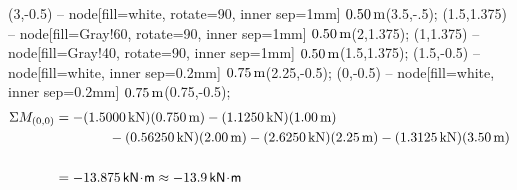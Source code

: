 \documentclass[10pt,oneside]{article}
\begin{document}
\begin{textblock*}{6.5in}
{     (3,-0.5) -- node[fill=white, rotate=90, inner sep=1mm] {\small $0.50\thinspace\text{m}$}(3.5,-.5);
     (1.5,1.375) -- node[fill=Gray!60, rotate=90, inner sep=1mm] {\small $0.50\thinspace\text{m}$}(2,1.375);
     (1,1.375) -- node[fill=Gray!40, rotate=90, inner sep=1mm] {\small $0.50\thinspace\text{m}$}(1.5,1.375);
     (1.5,-0.5) -- node[fill=white, inner sep=0.2mm] {\small $0.75\thinspace\text{m}$}(2.25,-0.5);
     (0,-0.5) -- node[fill=white, inner sep=0.2mm] {\small $0.75\thinspace\text{m}$}(0.75,-0.5);    
  }
  \large\parb
  \begin{align*}
    \Sigma M_{(0,0)} &= -(1.5000\,\text{kN})(0.750\,\text{m})-(1.1250\,\text{kN})(1.00\,\text{m})\\
    &\qquad\qquad -(0.56250\,\text{kN})(2.00\,\text{m})-(2.6250\,\text{kN})(2.25\,\text{m})-(1.3125\,\text{kN})(3.50\,\text{m}) \\\\
    &= -13.875\,\mathsf{kN\!\cdot\! m} \approx -13.9\,\mathsf{kN\!\cdot\! m}
  \end{align*}
\end{textblock*}
\end{document}

